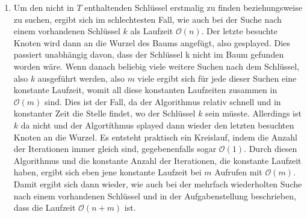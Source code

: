 \documentclass{scrartcl} %
\begin{document}
\begin{aufgabe}
\begin{enumerate}[label=(\alph*)]
\begin{align*}
                \Phi(T)= \sum_{x \in T} r(x) = \sum_{x \in T} \log s(x). 
            \end{align*} Da der Baum verändert wird, gilt dann mit Teil eins, dass $O_2 \in \mathcal{O}(\log n)$ ist. Nach dem ersten Teil folgt dann sofort für $O_1 + O_2$ als kombinierte amortisierte Laufzeit, dass die gesamte Funktion Splay-Search für ein geeignetes Potential eine Laufzeit in $\mathcal{O}(\log n)$ hat.
            \item Um den nicht in $T$ enthaltenden Schlüssel erstmalig zu finden beziehungsweise zu suchen, ergibt sich im schlechtesten Fall, wie auch bei der Suche nach einem vorhandenen Schlüssel $k$ als Laufzeit $\mathcal{O}(n)$. Der letzte besuchte Knoten wird dann an die Wurzel des Baums angefügt, also gesplayed. Dies passiert unabhängig davon, dass der Schlüssel k nicht im Baum gefunden worden wäre. Wenn danach beliebig viele weitere Suchen nach dem Schlüssel, also $k$ ausgeführt werden, also $m$ viele ergibt sich für jede dieser Suchen eine konstante Laufzeit, womit all diese konstanten Laufzeiten zusammen in $\mathcal{O}(m)$ sind. Dies ist der Fall, da der Algorithmus relativ schnell und in konstanter Zeit die Stelle findet, wo der Schlüssel $k$ sein müsste. Allerdings ist $k$ da nicht und der Algortíthmus splayed dann wieder den letzten besuchten Knoten an die Wurzel. Es entsteht praktisch ein Kreislauf, indem die Anzahl der Iterationen immer gleich sind, gegebenenfalls sogar $\mathcal{O}(1)$. Durch diesen Algorithmus und die konstante Anzahl der Iterationen, die konstante Laufzeit haben, ergibt sich eben jene konstante Laufzeit bei $m$ Aufrufen mit $\mathcal{O}(m)$. Damit ergibt sich dann wieder, wie auch bei der mehrfach wiederholten Suche nach einem vorhandenen Schlüssel und in der Aufgabenstellung beschrieben, dass die Laufzeit $\mathcal{O}(n+m)$ ist.
        \end{enumerate}
    \end{aufgabe}
\end{document}
